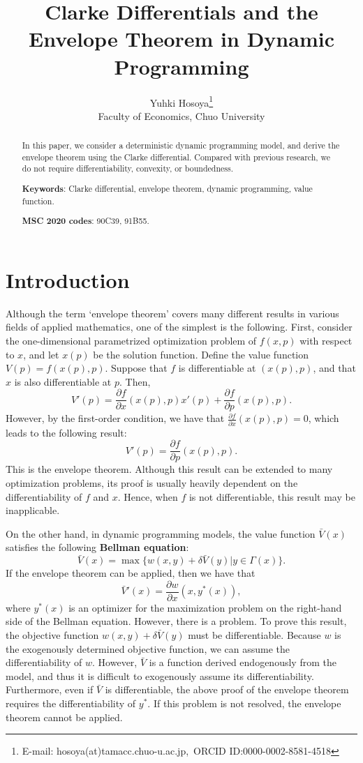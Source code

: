 \documentclass[a4paper,12pt]{article}
\title{Clarke Differentials and the Envelope Theorem in Dynamic Programming}
\author{Yuhki Hosoya\thanks{E-mail: hosoya(at)tamacc.chuo-u.ac.jp,\ ORCID ID:0000-0002-8581-4518}\\
Faculty of Economics, Chuo University}
\theoremstyle{definition}
\begin{document}
\maketitle

\begin{abstract}
In this paper, we consider a deterministic dynamic programming model, and derive the envelope theorem using the Clarke differential. Compared with previous research, we do not require differentiability, convexity, or boundedness.


\vspace{12pt}
\noindent
{\bf Keywords}: Clarke differential, envelope theorem, dynamic programming, value function.

\vspace{12pt}
\noindent
{\bf MSC 2020 codes}: 90C39, 91B55.
\end{abstract}


\section{Introduction}
Although the term `envelope theorem' covers many different results in various fields of applied mathematics, one of the simplest is the following. First, consider the one-dimensional parametrized optimization problem of $f(x,p)$ with respect to $x$, and let $x(p)$ be the solution function. Define the value function $V(p)=f(x(p),p)$. Suppose that $f$ is differentiable at $(x(p),p)$, and that $x$ is also differentiable at $p$. Then,
\[V'(p)=\frac{\partial f}{\partial x}(x(p),p)x'(p)+\frac{\partial f}{\partial p}(x(p),p).\]
However, by the first-order condition, we have that $\frac{\partial f}{\partial x}(x(p),p)=0$, which leads to the following result:
\[V'(p)=\frac{\partial f}{\partial p}(x(p),p).\]
This is the envelope theorem. Although this result can be extended to many optimization problems, its proof is usually heavily dependent on the differentiability of $f$ and $x$. Hence, when $f$ is not differentiable, this result may be inapplicable.

On the other hand, in dynamic programming models, the value function $\bar{V}(x)$ satisfies the following {\bf Bellman equation}:
\[\bar{V}(x)=\max\{w(x,y)+\delta \bar{V}(y)|y\in \Gamma(x)\}.\]
If the envelope theorem can be applied, then we have that
\[\bar{V}'(x)=\frac{\partial w}{\partial x}(x,y^*(x)),\]
where $y^*(x)$ is an optimizer for the maximization problem on the right-hand side of the Bellman equation. However, there is a problem. To prove this result, the objective function $w(x,y)+\delta \bar{V}(y)$ must be differentiable. Because $w$ is the exogenously determined objective function, we can assume the differentiability of $w$. However, $\bar{V}$ is a function derived endogenously from the model, and thus it is difficult to exogenously assume its differentiability. Furthermore, even if $\bar{V}$ is differentiable, the above proof of the envelope theorem requires the differentiability of $y^*$. If this problem is not resolved, the envelope theorem cannot be applied. 
\end{document}

